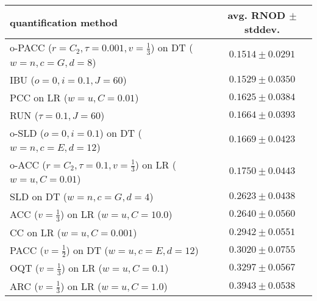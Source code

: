 \begin{tabular}{lc}
  \toprule
  quantification method & avg. RNOD $\pm$ stddev. \\
  \midrule
  o-PACC ($r=C_2, \tau=0.001, v=\frac{1}{3}$) on DT ($w=n, c=G, d=8$) & $\mathbf{0.1514 \pm 0.0291}$ \\
  IBU ($o=0, i=0.1, J=60$) & $\mathbf{0.1529 \pm 0.0350}$ \\
  PCC on LR ($w=u, C=0.01$) & $0.1625 \pm 0.0384$ \\
  RUN ($\tau=0.1, J=60$) & $0.1664 \pm 0.0393$ \\
  o-SLD ($o=0, i=0.1$) on DT ($w=n, c=E, d=12$) & $0.1669 \pm 0.0423$ \\
  o-ACC ($r=C_2, \tau=0.1, v=\frac{1}{3}$) on LR ($w=u, C=0.01$) & $0.1750 \pm 0.0443$ \\
  SLD on DT ($w=n, c=G, d=4$) & $0.2623 \pm 0.0438$ \\
  ACC ($v=\frac{1}{3}$) on LR ($w=u, C=10.0$) & $0.2640 \pm 0.0560$ \\
  CC on LR ($w=u, C=0.001$) & $0.2942 \pm 0.0551$ \\
  PACC ($v=\frac{1}{2}$) on DT ($w=u, c=E, d=12$) & $0.3020 \pm 0.0755$ \\
  OQT ($v=\frac{1}{3}$) on LR ($w=u, C=0.1$) & $0.3297 \pm 0.0567$ \\
  ARC ($v=\frac{1}{3}$) on LR ($w=u, C=1.0$) & $0.3943 \pm 0.0538$ \\
  \bottomrule
\end{tabular}
